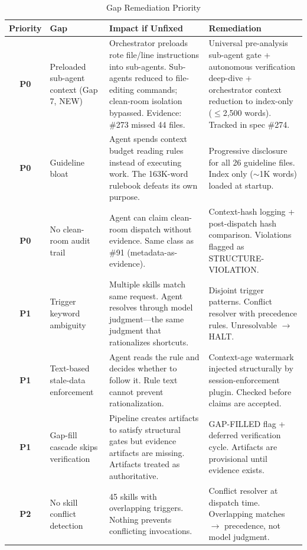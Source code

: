 \documentclass[11pt,a4paper]{article}
\begin{document}
\begin{table}[htbp]
\centering
\caption{Gap Remediation Priority}
\label{tab:priority}
\small
\begin{tabular}{@{}clp{4cm}p{5cm}@{}}
\toprule
\textbf{Priority} & \textbf{Gap} & \textbf{Impact if Unfixed} & \textbf{Remediation} \\
\midrule
\textbf{P0} & Preloaded sub-agent context (Gap 7, NEW) & Orchestrator preloads rote file/line instructions into sub-agents.  Sub-agents reduced to file-editing commands; clean-room isolation bypassed.  Evidence: \#273 missed 44 files. & Universal pre-analysis sub-agent gate + autonomous verification deep-dive + orchestrator context reduction to index-only ($\leq$2,500 words).  Tracked in spec \#274. \\
\midrule
\textbf{P0} & Guideline bloat & Agent spends context budget reading rules instead of executing work.  The 163K-word rulebook defeats its own purpose. & Progressive disclosure for all 26 guideline files.  Index only ($\sim$1K words) loaded at startup. \\
\midrule
\textbf{P0} & No clean-room audit trail & Agent can claim clean-room dispatch without evidence.  Same class as \#91 (metadata-as-evidence). & Context-hash logging + post-dispatch hash comparison.  Violations flagged as STRUCTURE-VIOLATION. \\
\midrule
\textbf{P1} & Trigger keyword ambiguity & Multiple skills match same request.  Agent resolves through model judgment---the same judgment that rationalizes shortcuts. & Disjoint trigger patterns.  Conflict resolver with precedence rules.  Unresolvable $\to$ HALT. \\
\midrule
\textbf{P1} & Text-based stale-data enforcement & Agent reads the rule and decides whether to follow it.  Rule text cannot prevent rationalization. & Context-age watermark injected structurally by session-enforcement plugin.  Checked before claims are accepted. \\
\midrule
\textbf{P1} & Gap-fill cascade skips verification & Pipeline creates artifacts to satisfy structural gates but evidence artifacts are missing.  Artifacts treated as authoritative. & GAP-FILLED flag + deferred verification cycle.  Artifacts are provisional until evidence exists. \\
\midrule
\textbf{P2} & No skill conflict detection & 45 skills with overlapping triggers.  Nothing prevents conflicting invocations. & Conflict resolver at dispatch time.  Overlapping matches $\to$ precedence, not model judgment. \\

\end{tabular}
\end{table}
\end{document}

